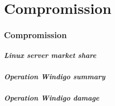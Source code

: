 \part{Compromission}
\section{Compromission}

\begin{frame}
	\partpage
\end{frame}

\begin{frame}
	\frametitle{Linux server market share}
\end{frame}

\begin{frame}
	\frametitle{Operation Windigo summary}
\end{frame}

\begin{frame}
	\frametitle{Operation Windigo damage}
\end{frame}
